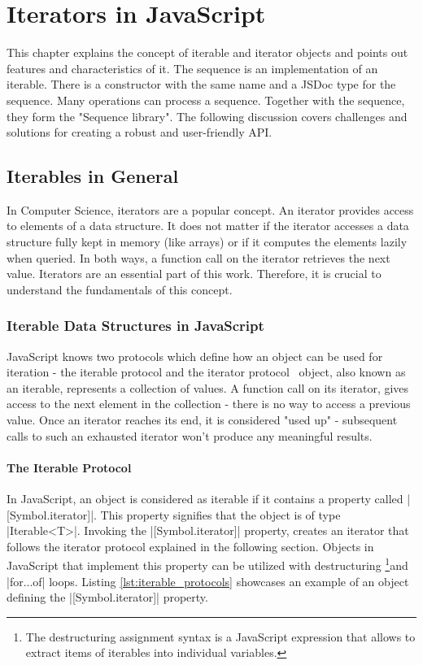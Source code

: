 \chapter{Iterators in JavaScript} %
\label{chap:Iterators in JavaScript}
This chapter explains the concept of iterable and iterator objects and points
out features and characteristics of it. The sequence is an implementation of an
iterable. There is a constructor with the same name and a JSDoc type for the
sequence. Many operations can process a sequence. Together with the sequence,
they form the "Sequence library". The following discussion covers challenges
and solutions for creating a robust and user-friendly API.

\section{Iterables in General}
\label{sec:Iterables in General}
In Computer Science, iterators are a popular concept. An iterator provides
access to elements of a data structure. It does not matter if the iterator
accesses a data structure fully kept in memory (like arrays) or if it computes
the elements lazily when queried. In both ways, a function call on the iterator
retrieves the next value. Iterators are an essential part of this work.
Therefore, it is crucial to understand the fundamentals of this concept.

\subsection{Iterable Data Structures in JavaScript}
\label{sub:Iterable data structures in JS}
JavaScript knows two protocols which define how an object can be used for
iteration - the iterable protocol and the iterator
protocol~\cite{mdn_protocols} object, also known as an iterable, represents a
collection of values. A function call on its iterator, gives access to the next
element in the collection - there is no way to access a previous value. Once an
iterator reaches its end, it is considered "used up" - subsequent calls to such
an exhausted iterator won't produce any meaningful results.

\subsubsection{The Iterable Protocol}
\label{subsub:The Iterable Protocol}
In JavaScript, an object is considered as iterable if it contains a property
called |[Symbol.iterator]|. This property signifies that the object is of type
|Iterable<T>|. Invoking the |[Symbol.iterator]| property, creates an
iterator that follows the iterator protocol explained in the following section.
Objects in JavaScript that implement this property can be utilized with
destructuring \footnote{The destructuring assignment syntax is a JavaScript
expression that allows to extract items of iterables into individual
variables.}and |for...of| loops. Listing \ref{lst:iterable_protocols}
showcases an example of an object defining the |[Symbol.iterator]| property.


